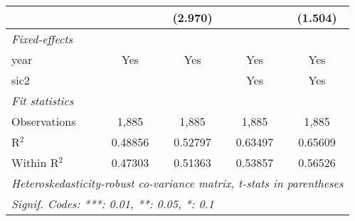 \begin{tabular}{lcccc}
                     &                & (2.970)        &                & (1.504)\\   
   \midrule
   \emph{Fixed-effects}\\
   year              & Yes            & Yes            & Yes            & Yes\\  
   sic2              &                &                & Yes            & Yes\\  
   \midrule
   \emph{Fit statistics}\\
   Observations      & 1,885          & 1,885          & 1,885          & 1,885\\  
   R$^2$             & 0.48856        & 0.52797        & 0.63497        & 0.65609\\  
   Within R$^2$      & 0.47303        & 0.51363        & 0.53857        & 0.56526\\  
   \midrule \midrule
   \multicolumn{5}{l}{\emph{Heteroskedasticity-robust co-variance matrix, t-stats in parentheses}}\\
   \multicolumn{5}{l}{\emph{Signif. Codes: ***: 0.01, **: 0.05, *: 0.1}}\\
\end{tabular}
\par\endgroup


